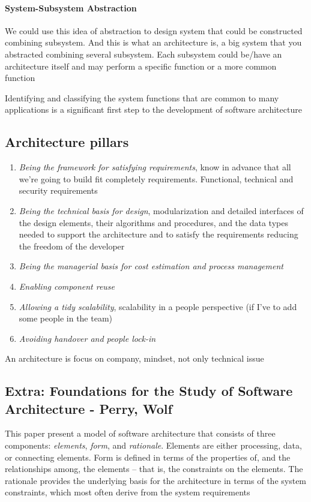 \paragraph{System-Subsystem Abstraction}
We could use this idea of abstraction to
design system that could be constructed combining subsystem. And this is what an architecture is, a big system that you abstracted combining several subsystem. Each subsystem could be/have an architecture itself and may perform a specific function or a more common function

Identifying and classifying the system functions that are common to many applications is a significant first step to the development of software architecture

\subsection{Architecture pillars}
\begin{enumerate}
    \item \textit{Being the framework for satisfying requirements}, know in advance that all we’re going to build fit completely requirements. Functional, technical and security requirements
    \item \textit{Being the technical basis for design}, modularization and detailed interfaces of the design elements, their algorithms and procedures, and the data types needed to support the architecture and to satisfy the requirements reducing the freedom of the developer
    \item \textit{Being the managerial basis for cost estimation and process management}
    \item \textit{Enabling component reuse}
    \item \textit{Allowing a tidy scalability}, scalability in a people perspective (if I’ve to add some people in the team)
    \item \textit{Avoiding handover and people lock-in}
\end{enumerate}

\begin{definition}
    An architecture is focus on company, mindset, not only technical issue
\end{definition}

\subsection{Extra: Foundations for the Study of Software Architecture - Perry, Wolf}
This paper present a model of software architecture that consists of three components: \textit{elements}, \textit{form}, and \textit{rationale}. Elements are either processing, data, or connecting elements. Form is defined in terms of the properties of, and the relationships among, the elements – that is, the constraints on the elements. The rationale provides the underlying basis for the architecture in terms of the system constraints, which most often derive from the system requirements

